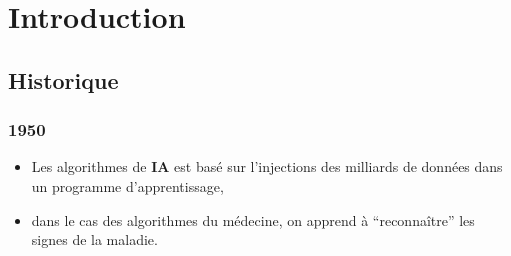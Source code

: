 \pagestyle{monstyle}\setcounter{page}{1}
\chapter{Introduction}
\section{Historique}
\subsection{1950}


\begin{itemize}
\item
Les algorithmes de \textbf{IA} est basé sur  l'injections des milliards de données
dans un programme d'apprentissage,
\item
dans le cas des algorithmes du médecine, on apprend à ``reconnaître'' les signes
de la maladie.
\end{itemize}
